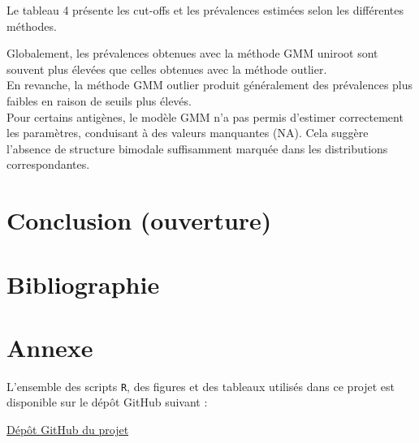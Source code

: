 \documentclass[a4paper]{article}
\begin{document}
Le tableau 4 présente les cut-offs et les prévalences estimées selon les différentes méthodes.

Globalement, les prévalences obtenues avec la méthode GMM uniroot sont souvent plus élevées que celles obtenues avec la méthode outlier. \\
En revanche, la méthode GMM outlier produit généralement des prévalences plus faibles en raison de seuils plus élevés.\\
Pour certains antigènes, le modèle GMM n’a pas permis d’estimer correctement les paramètres, conduisant à des valeurs manquantes (NA). Cela suggère l’absence de structure bimodale suffisamment marquée dans les distributions correspondantes.

\section{Conclusion (ouverture)}

\section{Bibliographie}




\section{Annexe}

L’ensemble des scripts \texttt{R}, des figures et des tableaux utilisés dans ce projet est disponible sur le dépôt GitHub suivant :

\begin{center}
\href{https://github.com/Bastien2003/Projet-M1SSD}{Dépôt GitHub du projet}
\end{center}
\end{document}
